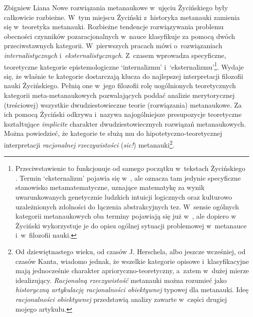 \begin{artplenv}{Zbigniew Liana}
Nowe rozwiązania metanaukowe w~ujęciu Życińskiego były całkowicie rozbieżne. W~tym miejscu Życiński z~historyka
metanauki zamienia się w~teoretyka metanauki. Rozbieżne tendencje rozwiązywania problemu obecności czynników
pozaracjonalnych w~nauce klasyfikuje za pomocą dwóch przeciwstawnych kategorii. W~pierwszych pracach
mówi o~rozwiązaniach \textit{internalistycznych} i~\textit{eksternalistycznych}. Z~czasem wprowadza specyficzne, teoretyczne
kategorie epistemologiczne `internalizmu' i~`eksternalizmu'\footnote{Przeciwstawienie to funkcjonuje od samego
początku w~tekstach Życińskiego
\parencites*[s.~141nn]{zycinski_jezyk_1983}[s.~12.16]{zycinski_structure_1988}[s.~21.29]{zycinski_struktura_2013}.
Termin
`eksternalizm' pojawia się w~\parencite[s.~120n]{zycinski_teizm_1985},
ale oznacza tam
jedynie specyficzne stanowisko metamatematyczne, uznające matematykę za wynik uwarunkowanych genetycznie ludzkich
intuicji logicznych oraz kulturowo uzależnionych zdolności do łączenia abstrakcyjnych tez. W~sensie ogólnych kategorii
metanaukowych oba terminy pojawiają się już
w~\parencite*[s.~242]{zycinski_granice_1993},
ale dopiero
w~\parencite*[s.~133nn]{zycinski_elementy_1996}
Życiński wykorzystuje je do opisu ogólnej sytuacji problemowej w~metanauce i~w~filozofii nauki.}. Wydaje się, że
właśnie te kategorie dostarczają klucza do najlepszej interpretacji filozofii nauki Życińskiego. Pełnią one w~jego
filozofii rolę uogólnionych teoretycznych kategorii meta-metanaukowych pozwalających poddać analizie merytorycznej
(treściowej) wszystkie dwudziestowieczne teorie (rozwiązania) metanaukowe. Za ich pomocą Życiński odkrywa i~nazywa
najogólniejsze presupozycje teoretyczne kształtujące \textit{implicite} charakter dwudziestowiecznych rozwiązań
metanaukowych. Można powiedzieć, że kategorie te służą mu do hipotetyczno-teoretycznej interpretacji \textit{racjonalnej}
\textit{rzeczywistości} (\textit{sic!}) metanauki\footnote{Od dziewiętnastego wieku, od czasów J. Herschela, albo jeszcze
wcześniej, od czasów Kanta, wiadomo jednak, że wszelkie kategorie opisowe i~klasyfikacyjne mają jednocześnie charakter
aprioryczno-teoretyczny, a~zatem w~dużej mierze idealizujący. \textit{Racjonalną rzeczywistość }metanauki można rozumieć
jako \textit{historyczną artykulację racjonalności obiektywnej} typowej dla metanauki. Ideę \textit{racjonalności
obiektywnej} przedstawią analizy zawarte w~części drugiej mojego artykułu.}.


\end{artplenv}
